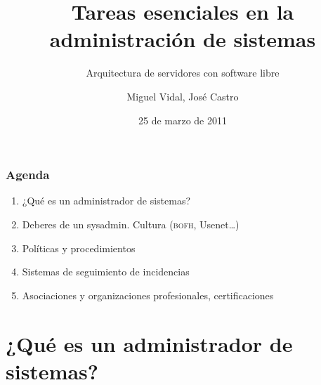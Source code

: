 \documentclass{beamer}
\begin{document}
\title{Tareas esenciales en la administración de sistemas}
\subtitle{Arquitectura de servidores con software libre}
\author{Miguel Vidal, José Castro}
\date{25 de marzo de 2011}



\begin{frame}
  \frametitle{Agenda}

\begin{enumerate}
\item ¿Qué es un administrador de sistemas? 
\item Deberes de un sysadmin. Cultura (\textsc{bofh}, Usenet\dots)
\item Políticas y procedimientos
\item Sistemas de seguimiento de incidencias
\item Asociaciones y organizaciones profesionales, certificaciones     
\end{enumerate}

\end{frame}

\section{¿Qué es un administrador de sistemas?}
\end{document}
